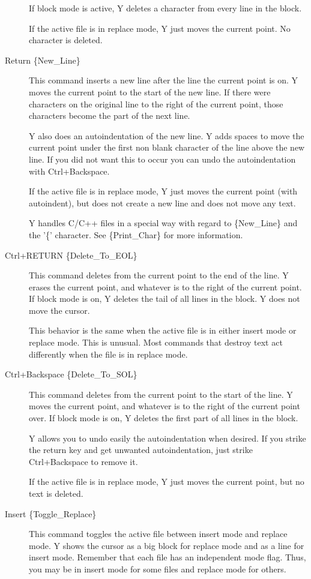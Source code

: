 \begin{description}
  If block mode is active, Y deletes a character from every line in the block.

  If the active file is in replace mode, Y just moves the current point. No character is
  deleted.

\item[Return \{New\_Line\}] This command inserts a new line after the line the current point is
  on. Y moves the current point to the start of the new line. If there were characters on the
  original line to the right of the current point, those characters become the part of the next
  line.

  Y also does an autoindentation of the new line. Y adds spaces to move the current point under
  the first non blank character of the line above the new line. If you did not want this to
  occur you can undo the autoindentation with Ctrl+Backspace.

  If the active file is in replace mode, Y just moves the current point (with autoindent), but
  does not create a new line and does not move any text.

  Y handles C/C++ files in a special way with regard to \{New\_Line\} and the '\{' character.
  See \{Print\_Char\} for more information.

\item[Ctrl+RETURN \{Delete\_To\_EOL\}] This command deletes from the current point to the end of
  the line. Y erases the current point, and whatever is to the right of the current point. If
  block mode is on, Y deletes the tail of all lines in the block. Y does not move the cursor.

  This behavior is the same when the active file is in either insert mode or replace mode. This
  is unusual. Most commands that destroy text act differently when the file is in replace mode.

\item[Ctrl+Backspace \{Delete\_To\_SOL\}] This command deletes from the current point to the
  start of the line. Y moves the current point, and whatever is to the right of the current
  point over. If block mode is on, Y deletes the first part of all lines in the block.

  Y allows you to undo easily the autoindentation when desired. If you strike the return key and
  get unwanted autoindentation, just strike Ctrl+Backspace to remove it.

  If the active file is in replace mode, Y just moves the current point, but no text is deleted.

\item[Insert \{Toggle\_Replace\}] This command toggles the active file between insert mode and
  replace mode. Y shows the cursor as a big block for replace mode and as a line for insert
  mode. Remember that each file has an independent mode flag. Thus, you may be in insert mode
  for some files and replace mode for others.

\end{description}

